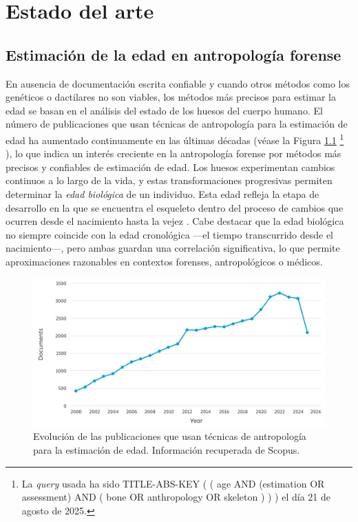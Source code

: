 \chapter{Estado del arte}


\section{Estimación de la edad en antropología forense}

En ausencia de documentación escrita confiable y cuando otros métodos como los genéticos o dactilares no son viables, los métodos más precisos para estimar la edad se basan en el análisis del estado de los huesos del cuerpo humano. El número de publicaciones que usan técnicas de antropología para la estimación de edad ha aumentado continuamente en las últimas décadas (véase la Figura \ref{fig:num_papers_1}%
\footnote{
    La \textit{query} usada ha sido
    TITLE-ABS-KEY ( ( age AND (estimation OR assessment) AND ( bone OR anthropology OR skeleton ) ) ) 
    el día 21 de agosto de 2025.
}%
), lo que indica un interés creciente en la antropología forense por métodos más precisos y confiables de estimación de edad.
Los huesos experimentan cambios continuos a lo largo de la vida, y estas transformaciones progresivas permiten determinar la \textit{edad biológica} de un individuo. Esta edad refleja la etapa de desarrollo en la que se encuentra el esqueleto dentro del proceso de cambios que ocurren desde el nacimiento hasta la vejez \cite{byers2023}. Cabe destacar que la edad biológica no siempre coincide con la edad cronológica ---el tiempo transcurrido desde el nacimiento---, pero ambas guardan una correlación significativa, lo que permite aproximaciones razonables en contextos forenses, antropológicos o médicos.

\begin{figure}[htbp]
    \centering
    \includegraphics[width=\textwidth]{capitulos/cap_03/imagenes/num_papers_1.png}
    \caption[
        Evolución de las publicaciones que usan técnicas de antropología para la estimación de edad. 
    ]{
        Evolución de las publicaciones que usan técnicas de antropología para la estimación de edad. 
        Información recuperada de Scopus.
    }
    \label{fig:num_papers_1}
\end{figure}

